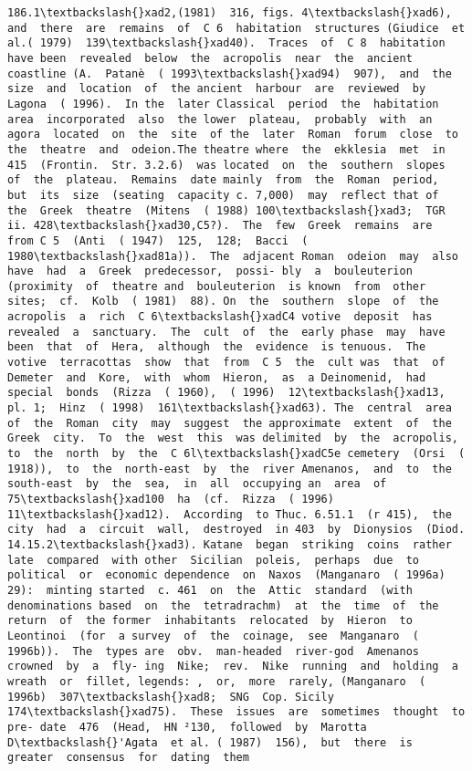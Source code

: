 \documentclass[11pt]{article}
\begin{document}
\begin{Verbatim}[commandchars=\\\{\}]
186.1\textbackslash{}xad2,(1981)  316, figs. 4\textbackslash{}xad6),  and  there  are  remains  of  C 6  habitation  structures (Giudice  et al.( 1979)  139\textbackslash{}xad40).  Traces  of  C 8  habitation  have been  revealed  below  the  acropolis  near  the  ancient  coastline (A.  Patanè  ( 1993\textbackslash{}xad94)  907),  and  the  size  and  location  of  the ancient  harbour  are  reviewed  by  Lagona  ( 1996).  In the  later Classical  period  the  habitation  area  incorporated  also  the lower  plateau,  probably  with  an  agora  located  on  the  site  of the  later  Roman  forum  close  to  the  theatre  and  odeion.The theatre where  the  ekklesia  met  in  415  (Frontin.  Str. 3.2.6)  was located  on  the  southern  slopes  of  the  plateau.  Remains  date mainly  from  the  Roman  period,  but  its  size  (seating  capacity c. 7,000)  may  reflect that of  the  Greek  theatre  (Mitens  ( 1988) 100\textbackslash{}xad3;  TGR  ii. 428\textbackslash{}xad30,C5?).  The  few  Greek  remains  are  from C 5  (Anti  ( 1947)  125,  128;  Bacci  ( 1980\textbackslash{}xad81a)).  The  adjacent Roman  odeion  may  also  have  had  a  Greek  predecessor,  possi- bly  a  bouleuterion  (proximity  of  theatre and  bouleuterion  is known  from  other  sites;  cf.  Kolb  ( 1981)  88). On  the  southern  slope  of  the  acropolis  a  rich  C 6\textbackslash{}xadC4 votive  deposit  has  revealed  a  sanctuary.  The  cult  of  the  early phase  may  have  been  that  of  Hera,  although  the  evidence  is tenuous.  The  votive  terracottas  show  that  from  C 5  the  cult was  that  of  Demeter  and  Kore,  with  whom  Hieron,  as  a Deinomenid,  had  special  bonds  (Rizza  ( 1960),  ( 1996)  12\textbackslash{}xad13, pl. 1;  Hinz  ( 1998)  161\textbackslash{}xad63). The  central  area  of  the  Roman  city  may  suggest  the approximate  extent  of  the  Greek  city.  To  the  west  this  was delimited  by  the  acropolis,  to  the  north  by  the  C 6l\textbackslash{}xadC5e cemetery  (Orsi  ( 1918)),  to  the  north-east  by  the  river Amenanos,  and  to  the  south-east  by  the  sea,  in  all  occupying an  area  of 75\textbackslash{}xad100  ha  (cf.  Rizza  ( 1996)  11\textbackslash{}xad12).  According  to Thuc. 6.51.1  (r 415),  the  city  had  a  circuit  wall,  destroyed  in 403  by  Dionysios  (Diod. 14.15.2\textbackslash{}xad3). Katane  began  striking  coins  rather  late  compared  with other  Sicilian  poleis,  perhaps  due  to  political  or  economic dependence  on  Naxos  (Manganaro  ( 1996a)  29):  minting started  c. 461  on  the  Attic  standard  (with  denominations based  on  the  tetradrachm)  at  the  time  of  the  return  of  the former  inhabitants  relocated  by  Hieron  to  Leontinoi  (for  a survey  of  the  coinage,  see  Manganaro  ( 1996b)).  The  types are  obv.  man-headed  river-god  Amenanos  crowned  by  a  fly- ing  Nike;  rev.  Nike  running  and  holding  a  wreath  or  fillet, legends: ,  or,  more  rarely, (Manganaro  ( 1996b)  307\textbackslash{}xad8;  SNG  Cop. Sicily 174\textbackslash{}xad75).  These  issues  are  sometimes  thought  to  pre- date  476  (Head,  HN ²130,  followed  by  Marotta  D\textbackslash{}'Agata  et al. ( 1987)  156),  but  there  is  greater  consensus  for  dating  them 
\end{Verbatim}
\end{document}
